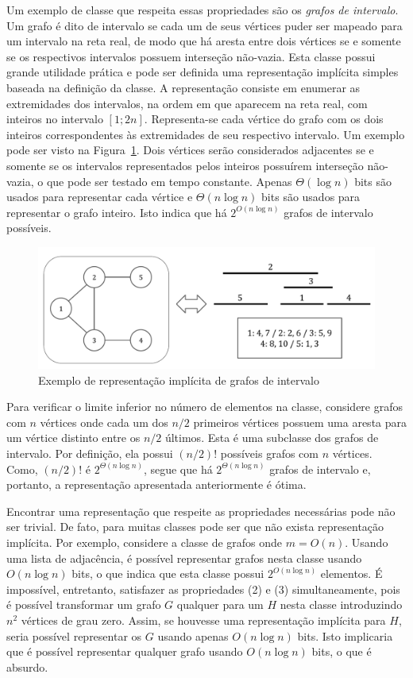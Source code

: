 Um exemplo de classe que respeita essas propriedades são os \emph{grafos de intervalo}. Um grafo é dito de intervalo se cada um de seus vértices puder ser mapeado para um intervalo na reta real, de modo que há aresta entre dois vértices se e somente se os respectivos intervalos possuem interseção não-vazia. Esta classe possui grande utilidade prática e pode ser definida uma representação implícita simples baseada na definição da classe. A representação consiste em enumerar as extremidades dos intervalos, na ordem em que aparecem na reta real, com inteiros no intervalo $[1;2n]$. Representa-se cada vértice do grafo com os dois inteiros correspondentes às extremidades de seu respectivo intervalo. Um exemplo pode ser visto na Figura~\ref{fig:graphs2}. Dois vértices serão considerados adjacentes se e somente se os intervalos representados pelos inteiros possuírem interseção não-vazia, o que pode ser testado em tempo constante. Apenas $\Theta(\log n)$ bits são usados para representar cada vértice e $\Theta(n\log n)$ bits são usados para representar o grafo inteiro. Isto indica que há $2^{O(n \log n)}$ grafos de intervalo possíveis.

\begin{figure}[!htbp]
  \centering
  \includegraphics[scale=0.6]{figures/graphs2.pdf}
  \caption{Exemplo de representação implícita de grafos de intervalo}
  \label{fig:graphs2}
\end{figure}


Para verificar o limite inferior no número de elementos na classe, considere grafos com $n$ vértices onde cada um dos $n/2$ primeiros vértices possuem uma aresta para um vértice distinto entre os $n/2$ últimos. Esta é uma subclasse dos grafos de intervalo. Por definição, ela possui $(n/2)!$ possíveis grafos com $n$ vértices. Como, $(n/2)!$ é $2^{\Theta(n \log n)}$, segue que há $2^{\Theta(n \log n)}$ grafos de intervalo e, portanto, a representação apresentada anteriormente é ótima.

Encontrar uma representação que respeite as propriedades necessárias pode não ser trivial. De fato, para muitas classes pode ser que não exista representação implícita. Por exemplo, considere a classe de grafos onde $m = O(n)$. Usando uma lista de adjacência, é possível representar grafos nesta classe usando $O(n \log n)$ bits, o que indica que esta classe possui $2^{O(n\log n)}$ elementos. É impossível, entretanto, satisfazer as propriedades (2) e (3) simultaneamente, pois é possível transformar um grafo $G$ qualquer para um $H$ nesta classe introduzindo $n^2$ vértices de grau zero. Assim, se houvesse uma representação implícita para $H$, seria possível representar os $G$ usando apenas $O(n \log n)$ bits. Isto implicaria que é possível representar qualquer grafo usando $O(n \log n)$ bits, o que é absurdo.

